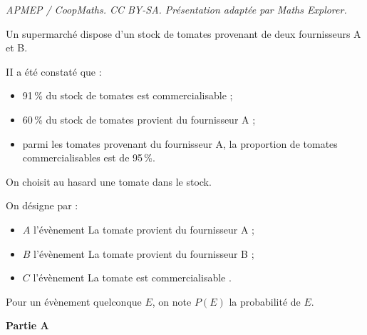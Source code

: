 \documentclass[10pt]{article}
\begin{document}
\noindent\textit{APMEP / CoopMaths. CC BY-SA. Présentation adaptée par Maths Explorer.}\par\medskip
Un supermarché dispose d'un stock de tomates provenant de deux fournisseurs A et B.

II a été constaté que :

\begin{itemize}[label=$\bullet~$]
\item 91\,\% du stock de tomates est commercialisable ;
\item 60\,\% du stock de tomates provient du fournisseur A ;
\item parmi les tomates provenant du fournisseur A, la proportion de tomates commercialisables
est de 95\,\%.
\end{itemize}

On choisit au hasard une tomate dans le stock.

On désigne par :
\begin{itemize}[label=$\bullet~$]
\item $A$ l'évènement \og La tomate provient du fournisseur A \fg ;
\item $B$ l'évènement \og La tomate provient du fournisseur B \fg ;
\item $C$ l'évènement \og La tomate est commercialisable \fg.
\end{itemize}

Pour un évènement quelconque $E$, on note $P(E)$ la probabilité de $E$.

\medskip

\textbf{Partie A}

\medskip
\end{document}
